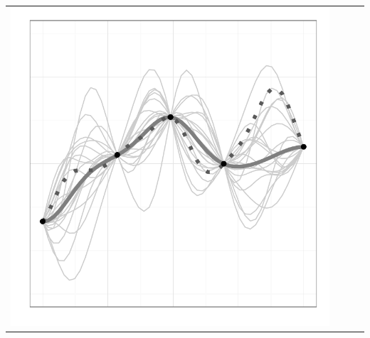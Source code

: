 \documentclass[a4paper,natbib]{apa6}
\begin{document}
\begin{table}[h!]
\begin{tabular}{lccc}
\includegraphics[scale=0.2]{figure14.pdf}
\\


\end{tabular}
\end{table}
\end{document}
